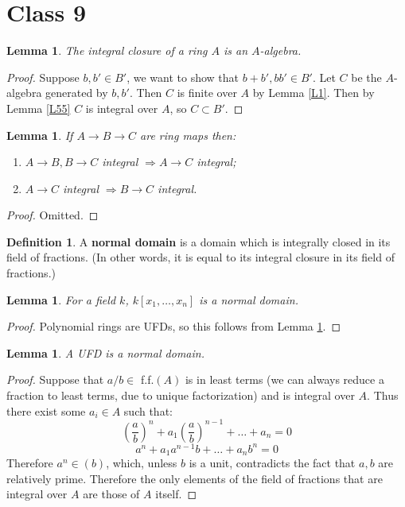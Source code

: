 \documentclass{article}
\theoremstyle{plain}
\newtheorem{lem}[thm]{Lemma}
\theoremstyle{definition}
\newtheorem{defn}{Definition}
\theoremstyle{remark}
\begin{document}
\section*{Class 9}
\begin{lem}
\label{L56}
The integral closure of a ring $A$ is an $A$-algebra.
\end{lem}
\begin{proof}
Suppose $b,b' \in B'$, we want to show that $b+b', bb' \in B'$. Let $C$ be the $A$-algebra generated by $b,b'$. Then $C$ is finite over $A$ by Lemma \ref{L1}. Then by Lemma \ref{L55} $C$ is integral over $A$, so $C\subset B'$.
\end{proof}

\begin{lem}
\label{L57}
If $A\to B \to C$ are ring maps then:
\begin{enumerate}
\item $A\to B, B\to C$ integral $\Rightarrow A\to C$ integral;
\item $A\to C$ integral $\Rightarrow B\to C$ integral.
\end{enumerate}
\end{lem}
\begin{proof}
Omitted.
\end{proof}

\begin{defn}
A \textbf{normal domain} is a domain which is integrally closed in its field of fractions. (In other words, it is equal to its integral closure in its field of fractions.)
\end{defn}

\begin{lem}
\label{L58}
For a field $k$, $k[x_1, \dots, x_n]$ is a normal domain.
\end{lem}
\begin{proof}
Polynomial rings are UFDs, so this follows from Lemma \ref{L59}.
\end{proof}

\begin{lem}
\label{L59}
A UFD is a normal domain.
\end{lem}
\begin{proof}
Suppose that $a/b \in$ f.f.$(A)$ is in least terms (we can always reduce a fraction to least terms, due to unique factorization) and is integral over $A$. Thus there exist some $a_i \in A$ such that:
\[         \left( \frac{a}{b} \right)^n +  a_1 \left( \frac{a}{b} \right)^{n-1} + \dots + a_n = 0       \]
\[       a^n + a_1 a^{n-1} b + \dots + a_n b^n = 0    \]
Therefore $a^n \in (b)$, which, unless $b$ is a unit, contradicts the fact that $a, b$ are relatively prime. Therefore the only elements of the field of fractions that are integral over $A$ are those of $A$ itself.
\end{proof}
\end{document}
